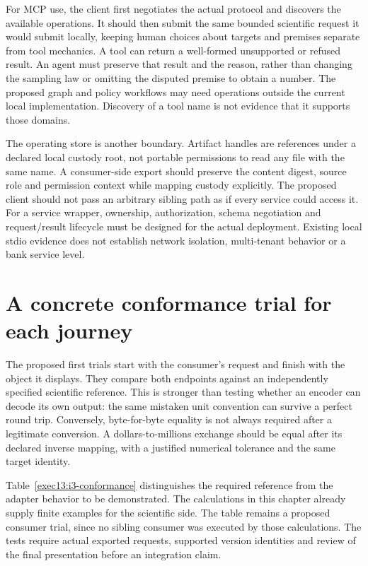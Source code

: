For MCP use, the client first negotiates the actual protocol and discovers
the available operations. It should then submit the same bounded scientific
request it would submit locally, keeping human choices about targets and
premises separate from tool mechanics. A tool can return a well-formed
unsupported or refused result. An agent must preserve that result and the
reason, rather than changing the sampling law or omitting the disputed
premise to obtain a number. The proposed graph and policy workflows may
need operations outside the current local implementation. Discovery of a
tool name is not evidence that it supports those domains.

The operating store is another boundary. Artifact handles are references
under a declared local custody root, not portable permissions to read any
file with the same name. A consumer-side export should preserve the content
digest, source role and permission context while mapping custody explicitly.
The proposed client should not pass an arbitrary sibling path as if every
service could access it. For a service wrapper, ownership, authorization,
schema negotiation and request/result lifecycle must be designed for the
actual deployment. Existing local stdio evidence does not establish network
isolation, multi-tenant behavior or a bank service level.

\section{A concrete conformance trial for each journey}

The proposed first trials start with the consumer's request and finish with
the object it displays. They compare both endpoints against an independently
specified scientific reference. This is stronger than testing whether an
encoder can decode its own output: the same mistaken unit convention can
survive a perfect round trip. Conversely, byte-for-byte equality is not always
required after a legitimate conversion. A dollars-to-millions exchange should
be equal after its declared inverse mapping, with a justified numerical
tolerance and the same target identity.

Table~\ref{exec13:i3-conformance} distinguishes the required reference from
the adapter behavior to be demonstrated. The calculations in this chapter
already supply finite examples for the scientific side. The table remains a
proposed consumer trial, since no sibling consumer was executed by those
calculations. The tests require actual exported requests, supported version
identities and review of the final presentation before an integration claim.

